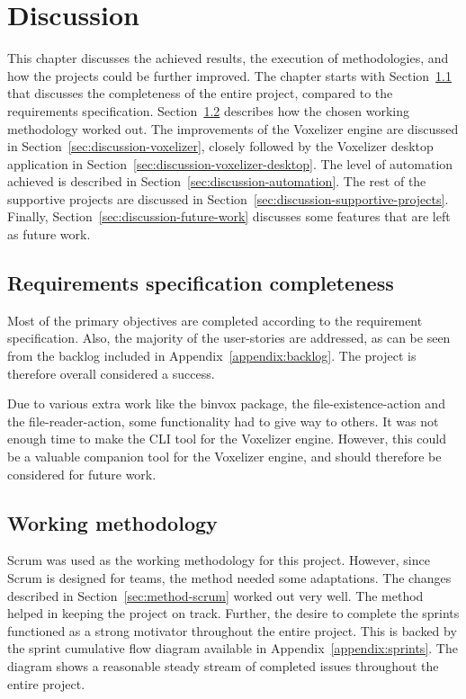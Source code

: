 \chapter{Discussion}
This chapter discusses the achieved results, the execution of methodologies, and how the projects could be further improved. The chapter starts with Section~\ref{sec:discussion-requirements-scesification} that discusses the completeness of the entire project, compared to the requirements specification. Section~\ref{sec:discussion-working-methodology} describes how the chosen working methodology worked out. The improvements of the Voxelizer engine are discussed in Section~\ref{sec:discussion-voxelizer}, closely followed by the Voxelizer desktop application in Section~\ref{sec:discussion-voxelizer-desktop}. The level of automation achieved is described in Section~\ref{sec:discussion-automation}. The rest of the supportive projects are discussed in Section~\ref{sec:discussion-supportive-projects}. Finally, Section~\ref{sec:discussion-future-work} discusses some features that are left as future work.

\section{Requirements specification completeness}
\label{sec:discussion-requirements-scesification}
Most of the primary objectives are completed according to the requirement specification. Also, the majority of the user-stories are addressed, as can be seen from the backlog included in Appendix~\ref{appendix:backlog}. The project is therefore overall considered a success.

Due to various extra work like the binvox package, the file-existence-action and the file-reader-action, some functionality had to give way to others. It was not enough time to make the CLI tool for the Voxelizer engine. However, this could be a valuable companion tool for the Voxelizer engine, and should therefore be considered for future work.

\section{Working methodology}
\label{sec:discussion-working-methodology}
Scrum was used as the working methodology for this project. However, since Scrum is designed for teams, the method needed some adaptations. The changes described in Section~\ref{sec:method-scrum} worked out very well. The method helped in keeping the project on track. Further, the desire to complete the sprints functioned as a strong motivator throughout the entire project. This is backed by the sprint cumulative flow diagram available in Appendix~\ref{appendix:sprints}. The diagram shows a reasonable steady stream of completed issues throughout the entire project.

